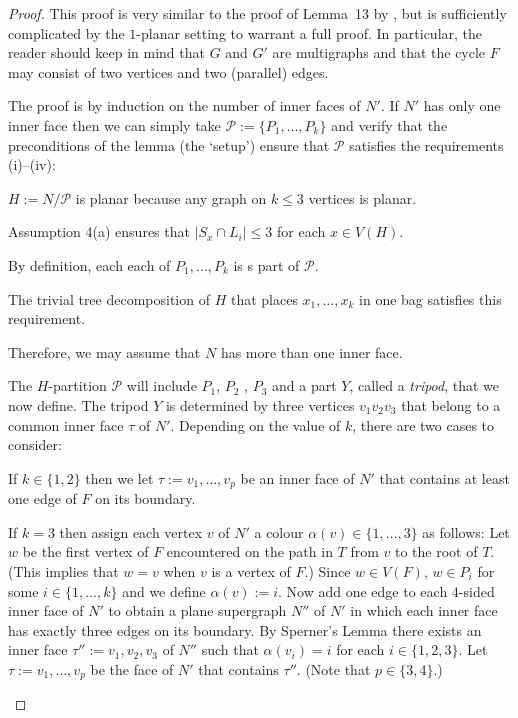 \documentclass{patmorin}
\newcommand{\PP}{\mathcal{P}}
\renewcommand{\le}{\leqslant}
\begin{document}
\begin{proof}
  This proof is very similar to the proof of Lemma~13 by \citet{DJMMUW20}, but is sufficiently complicated by the $1$-planar setting to warrant a full proof.  In particular, the reader should keep in mind that $G$ and $G'$ are multigraphs and that the cycle $F$ may consist of two vertices and two (parallel) edges.

  The proof is by induction on the number of inner faces of $N'$.  If $N'$ has only one inner face then we can simply take $\PP:=\{P_1,\ldots,P_k\}$ and verify that the preconditions of the lemma (the `setup') ensure that $\PP$ satisfies the requirements (i)--(iv):
  \begin{inparaenum}[(i)]
    \item $H:=N/\mathcal{P}$ is planar because any graph on $k\le 3$ vertices is planar.
    \item Assumption 4(a) ensures that $|S_x\cap L_i|\le 3$ for each $x\in V(H)$.
    \item By definition, each each of $P_1,\ldots,P_k$ is s part of $\mathcal{P}$.
    \item The trivial tree decomposition of $H$ that places $x_1,\ldots,x_k$ in one bag satisfies this requirement.
  \end{inparaenum}
  Therefore, we may assume that $N$ has more than one inner face.

  The $H$-partition $\mathcal{P}$ will include $P_1$, $P_2$ , $P_3$ and a part $Y$, called a \emph{tripod}, that we now define.  The tripod $Y$ is determined by three vertices $v_1v_2v_3$ that belong to a common inner face $\tau$ of $N'$.  Depending on the value of $k$, there are two cases to consider:
  \begin{compactenum}
    \item If $k\in\{1,2\}$ then we let $\tau:=v_1,\ldots,v_p$ be an inner face of $N'$ that contains at least one edge of $F$ on its boundary.

    \item If $k=3$ then assign each vertex $v$ of $N'$ a colour $\alpha(v)\in\{1,\ldots,3\}$ as follows:  Let $w$ be the first vertex of $F$ encountered on the path in $T$ from $v$ to the root of $T$.  (This implies that $w=v$ when $v$ is a vertex of $F$.)  Since $w\in V(F)$, $w\in P_i$ for some $i\in\{1,\ldots,k\}$ and we define $\alpha(v):=i$.  Now add one edge to each $4$-sided inner face of $N'$ to obtain a plane supergraph $N''$ of $N'$ in which each inner face has exactly three edges on its boundary. By Sperner's Lemma there exists an inner face $\tau'':=v_1,v_2,v_3$ of $N''$ such that $\alpha(v_i)=i$ for each $i\in\{1,2,3\}$.  Let $\tau:=v_1,\ldots,v_p$ be the face of $N'$ that contains $\tau''$.  (Note that $p\in\{3,4\}$.)
  \end{compactenum}


\end{proof}
\end{document}
